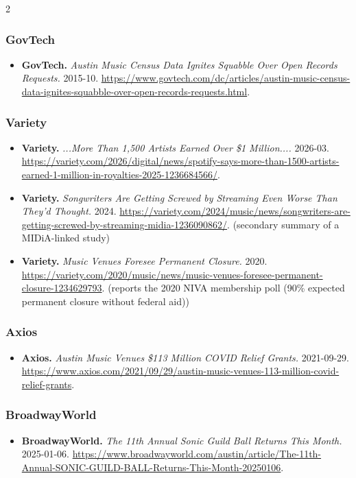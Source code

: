 {\begin{multicols}{2}
\subsubsection*{GovTech}
\begin{itemize}[itemsep=0pt,topsep=1pt,parsep=0pt,partopsep=0pt,leftmargin=1em]
\item \textbf{GovTech.} \textit{Austin Music Census Data Ignites Squabble Over Open Records Requests.} 2015-10. \url{https://www.govtech.com/dc/articles/austin-music-census-data-ignites-squabble-over-open-records-requests.html}.
\end{itemize}
\subsubsection*{Variety}
\begin{itemize}[itemsep=0pt,topsep=1pt,parsep=0pt,partopsep=0pt,leftmargin=1em]
\item \textbf{Variety.} \textit{...More Than 1,500 Artists Earned Over \$1 Million....} 2026-03. \url{https://variety.com/2026/digital/news/spotify-says-more-than-1500-artists-earned-1-million-in-royalties-2025-1236684566/}.
\item \textbf{Variety.} \textit{Songwriters Are Getting Screwed by Streaming Even Worse Than They’d Thought.} 2024. \url{https://variety.com/2024/music/news/songwriters-are-getting-screwed-by-streaming-midia-1236090862/}. {\color{ammuted}(secondary summary of a MIDiA-linked study)}
\item \textbf{Variety.} \textit{Music Venues Foresee Permanent Closure.} 2020. \url{https://variety.com/2020/music/news/music-venues-foresee-permanent-closure-1234629793}. {\color{ammuted}(reports the 2020 NIVA membership poll (90\% expected permanent closure without federal aid))}
\end{itemize}
\subsubsection*{Axios}
\begin{itemize}[itemsep=0pt,topsep=1pt,parsep=0pt,partopsep=0pt,leftmargin=1em]
\item \textbf{Axios.} \textit{Austin Music Venues \$113 Million COVID Relief Grants.} 2021-09-29. \url{https://www.axios.com/2021/09/29/austin-music-venues-113-million-covid-relief-grants}.
\end{itemize}
\subsubsection*{BroadwayWorld}
\begin{itemize}[itemsep=0pt,topsep=1pt,parsep=0pt,partopsep=0pt,leftmargin=1em]
\item \textbf{BroadwayWorld.} \textit{The 11th Annual Sonic Guild Ball Returns This Month.} 2025-01-06. \url{https://www.broadwayworld.com/austin/article/The-11th-Annual-SONIC-GUILD-BALL-Returns-This-Month-20250106}.
\end{itemize}

\end{multicols}}
